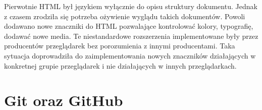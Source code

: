 Pierwotnie HTML był językiem wyłącznie do opisu struktury dokumentu. Jednak z czasem zrodziła się potrzeba ożywienie wyglądu takich dokumentów. Powoli dodawano nowe znaczniki do HTML pozwalające kontrolować kolory, typografię, dodawać nowe media. Te niestandardowe rozszerzenia implementowane były przez producentów przeglądarek bez porozumienia z innymi producentami. Taka sytuacja doprowadziła do zaimplementowania nowych znaczników działających w konkretnej grupie przeglądarek i nie działających w innych przeglądarkach. 

\section{Git oraz GitHub}


